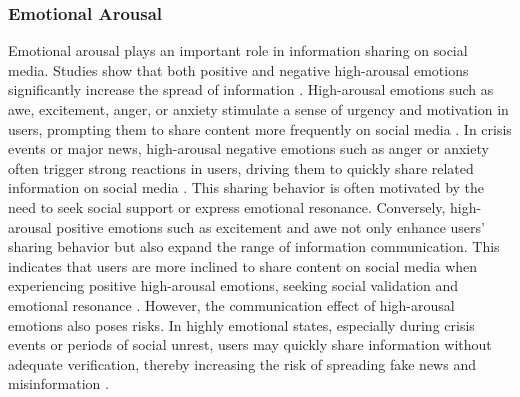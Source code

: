 \subsubsection{Emotional Arousal}
Emotional arousal plays an important role in information sharing on social media. Studies show that both positive and negative high-arousal emotions significantly increase the spread of information \cite{berger2011arousal}. High-arousal emotions such as awe, excitement, anger, or anxiety stimulate a sense of urgency and motivation in users, prompting them to share content more frequently on social media \cite{berger2012makes}. In crisis events or major news, high-arousal negative emotions such as anger or anxiety often trigger strong reactions in users, driving them to quickly share related information on social media \cite{lopez2021translating, sanford2004negative}. This sharing behavior is often motivated by the need to seek social support or express emotional resonance. Conversely, high-arousal positive emotions such as excitement and awe not only enhance users' sharing behavior but also expand the range of information communication. This indicates that users are more inclined to share content on social media when experiencing positive high-arousal emotions, seeking social validation and emotional resonance \cite{son2022emotion}. However, the communication effect of high-arousal emotions also poses risks. In highly emotional states, especially during crisis events or periods of social unrest, users may quickly share information without adequate verification, thereby increasing the risk of spreading fake news and misinformation \cite{dabbous2023influence}. 

